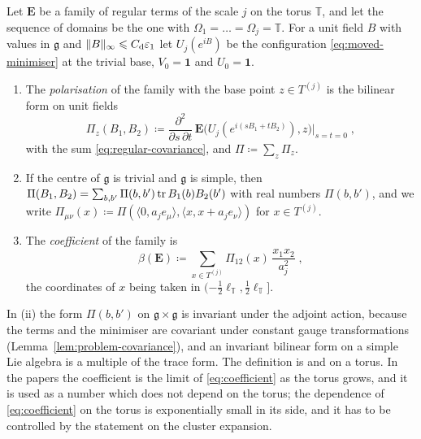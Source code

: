 \documentclass[11pt]{preprint}
\newcommand{\id}{\mathbf 1}
\DeclarePairedDelimiter{\norm}{\lVert}{\rVert}
\numberwithin{equation}{section}
\begin{document}
\begin{definition}\label{def:polarisation}
Let $\mathbf E$ be a family of regular terms of the scale $j$ on the torus $\mathbb T$, and let the sequence of domains be the one with $\Omega_1 = \dots = \Omega_j = \mathbb T$. For a unit field $B$ with values in $\mathfrak g$ and $\norm B_\infty \leqslant C_{\mathrm d}\varepsilon_1$ let $U_j(e^{iB})$ be the configuration \eqref{eq:moved-minimiser} at the trivial base, $V_0 = \id$ and $U_0 = \id$.
\begin{enumerate}[label=(\roman*)]
\item The \emph{polarisation} of the family with the base point $z \in T^{(j)}$ is the bilinear form on unit fields
\begin{equation}\label{eq:polarisation}
    \Pi_z(B_1, B_2) \coloneqq \frac{\partial^2}{\partial s\,\partial t}\,\mathbf E\bigl(U_j(e^{i(sB_1 + tB_2)}), z\bigr)\Big|_{s=t=0}\;,
\end{equation}
with the sum \eqref{eq:regular-covariance}, and $\Pi \coloneqq \sum_z\Pi_z$.
\item If the centre of $\mathfrak g$ is trivial and $\mathfrak g$ is simple, then $\Pi(B_1, B_2) = \sum_{b, b'}\Pi(b, b')\operatorname{tr} B_1(b)B_2(b')$ with real numbers $\Pi(b, b')$, and we write $\Pi_{\mu\nu}(x) \coloneqq \Pi(\langle 0, a_je_\mu\rangle, \langle x, x + a_je_\nu\rangle)$ for $x \in T^{(j)}$.
\item The \emph{coefficient} of the family is
\begin{equation}\label{eq:coefficient}
    \beta(\mathbf E) \coloneqq \sum_{x \in T^{(j)}}\Pi_{12}(x)\,\frac{x_1x_2}{a_j^2}\;,
\end{equation}
the coordinates of $x$ being taken in $(-\frac{1}{2}\ell_{\mathbb T}, \frac{1}{2}\ell_{\mathbb T}]$.
\end{enumerate}
\end{definition}

In (ii) the form $\Pi(b, b')$ on $\mathfrak g \times \mathfrak g$ is invariant under the adjoint action, because the terms and the minimiser are covariant under constant gauge transformations (Lemma~\ref{lem:problem-covariance}), and an invariant bilinear form on a simple Lie algebra is a multiple of the trace form. The definition is \cite[(1.20)--(1.22), p.~264]{BalabanRG1} and \cite[(3.50), (3.57), (3.61)]{BalabanCRE} on a torus. In the papers the coefficient is the limit of \eqref{eq:coefficient} as the torus grows, and it is used as a number which does not depend on the torus; the dependence of \eqref{eq:coefficient} on the torus is exponentially small in its side, and it has to be controlled by the statement on the cluster expansion.
\end{document}
